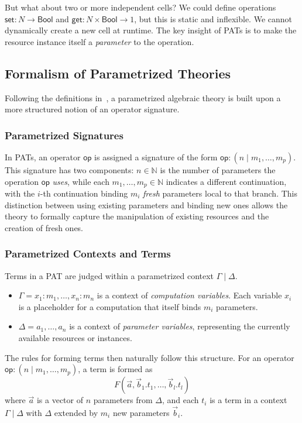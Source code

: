 \documentclass{article}
\theoremstyle{definition}
\theoremstyle{remark}
\newcommand{\BN}{\ensuremath{\mathbb N}}
\newcommand\bool{\mathsf{Bool}}
\newcommand\op{\mathsf{op}}
\newcommand\get{\mathsf{get}}
\newcommand\set{\mathsf{set}}
\begin{document}
But what about two or more independent cells?
We could define operations $\set: N \to \bool$ and $\get: N \times \bool \to 1$, but this is static and inflexible.
We cannot dynamically create a new cell at runtime. The key insight of PATs is to make the resource instance itself a \emph{parameter} to the operation.

\subsection{Formalism of Parametrized Theories}

Following the definitions in~\cite{staton_instances_2013, staton_algebraic_2013}, a parametrized algebraic theory is built upon a more structured notion of an operator signature.

\subsubsection{Parametrized Signatures}

In PATs, an operator $\op$ is assigned a signature of the form $\op:(n\mid m_1,\dots ,m_p)$. This signature has two components:
$n \in \BN$ is the number of parameters the operation $\op$ \emph{uses}, while each
$m_1,\dots ,m_p \in \BN$ indicates a different continuation, with the $i$-th continuation binding $m_i$ \emph{fresh} parameters local to that branch.
This distinction between using existing parameters and binding new ones allows the theory to formally capture the manipulation of existing resources and the creation of fresh ones.

\subsubsection{Parametrized Contexts and Terms}

Terms in a PAT are judged within a parametrized context $\Gamma\mid\Delta$.
\begin{itemize}
    \item $\Gamma = x_1:m_1, \dots, x_n:m_n$ is a context of \emph{computation variables}. Each variable $x_i$ is a placeholder for a computation that itself binds $m_i$ parameters.
    \item $\Delta = a_1, \dots, a_n$ is a context of \emph{parameter variables}, representing the currently available resources or instances.
\end{itemize}
The rules for forming terms then naturally follow this structure. For an operator $\op: (n\mid m_1,\dots,m_p)$, a term is formed as
\begin{displaymath}
  F(\vec{a}, \vec{b}_1.t_1, \dots, \vec{b}_l.t_l)
\end{displaymath}
where $\vec{a}$ is a vector of $n$ parameters from $\Delta$, and each $t_i$ is a term in a context $\Gamma\mid\Delta$ with $\Delta$ extended by $m_i$ new parameters $\vec{b}_i$.
\end{document}
